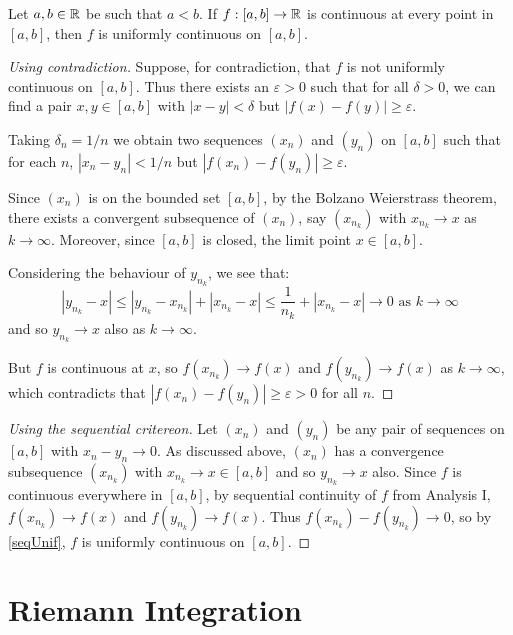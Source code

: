 \documentclass[../main.tex]{subfiles}
\begin{document}
\begin{theorem}
  Let $a, b \in \mathbb{R}$ be such that $a < b$.
  If $f: [a, b] \to \mathbb{R}$ is continuous at every point in $[a, b]$, then $f$ is uniformly continuous on $[a, b]$. \label{contToUnif}
\end{theorem}
\begin{proof}[Using contradiction]
  Suppose, for contradiction, that $f$ is not uniformly continuous on $[a, b]$.
  Thus there exists an $\varepsilon > 0$ such that for all $\delta > 0$, we can find a pair $x, y \in [a, b]$ with $|x - y| < \delta$ but $|f(x) - f(y)| \geq \varepsilon$.

  Taking $\delta_n = 1/n$ we obtain two sequences $(x_n)$ and $(y_n)$ on $[a, b]$ such that for each $n$, $|x_n - y_n| < 1/n$ but $|f(x_n) - f(y_n)| \geq \varepsilon$.

  Since $(x_n)$ is on the bounded set $[a, b]$, by the Bolzano Weierstrass theorem, there exists a convergent subsequence of $(x_n)$, say $(x_{n_k})$ with $x_{n_k} \to x$ as $k \to \infty$.
  Moreover, since $[a, b]$ is closed, the limit point $x \in [a, b]$.

  Considering the behaviour of $y_{n_k}$, we see that:
  \[
    |y_{n_k} - x|  \leq |y_{n_k} - x_{n_k}| + |x_{n_k} - x| \leq \frac{1}{n_k} + |x_{n_k} - x| \to 0 \text{ as } k \to \infty
  \]
  and so $y_{n_k} \to x$ also as $k \to \infty$.

  But $f$ is continuous at $x$, so $f(x_{n_k}) \to f(x)$ and $f(y_{n_k}) \to f(x)$ as $k \to \infty$, which contradicts that $|f(x_n) - f(y_n)| \geq \varepsilon > 0$ for all $n$.
\end{proof}
\begin{proof}[Using the sequential critereon]
  Let $(x_n)$ and $(y_n)$ be any pair of sequences on $[a, b]$ with $x_n - y_n \to 0$.
  As discussed above, $(x_n)$ has a convergence subsequence $(x_{n_k})$ with $x_{n_k} \to x \in [a, b]$ and so $y_{n_k} \to x$ also.
  Since $f$ is continuous everywhere in $[a, b]$, by sequential continuity of $f$ from Analysis I, $f(x_{n_k}) \to f(x)$ and $f(y_{n_k}) \to f(x)$.
  Thus $f(x_{n_k}) - f(y_{n_k}) \to 0$, so by \cref{seqUnif}, $f$ is uniformly continuous on $[a, b]$.
\end{proof}
\section{Riemann Integration}
\end{document}
